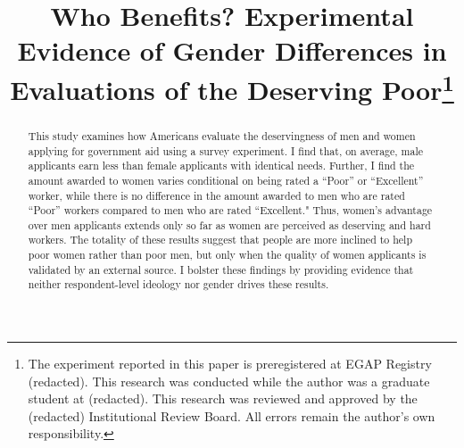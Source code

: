 \documentclass[12pt]{article}%
\title{Who Benefits? Experimental Evidence of Gender Differences in Evaluations of the Deserving Poor\thanks{The experiment reported in this paper is preregistered at EGAP Registry (redacted). %
This research was conducted while the author was a graduate student at (redacted). This research was reviewed and approved by the (redacted) Institutional Review Board. All errors remain the author's own responsibility.}}
\begin{document}
\maketitle
\thispagestyle{empty}


\begin{abstract}
This study examines how Americans evaluate the deservingness of men and women applying for government aid using a survey experiment. I find that, on average, male applicants earn less than female applicants with identical needs. Further, I find the amount awarded to women varies conditional on being rated a ``Poor” or ``Excellent” worker, while there is no difference in the amount awarded to men who are rated ``Poor” workers compared to men who are rated ``Excellent." Thus, women’s advantage over men applicants extends only so far as women are perceived as deserving and hard workers. The totality of these results suggest that people are more inclined to help poor women rather than poor men, but only when the quality of women applicants is validated by an external source. I bolster these findings by providing evidence that neither respondent-level ideology nor gender drives these results.


\end{abstract}


\newpage
\end{document}
